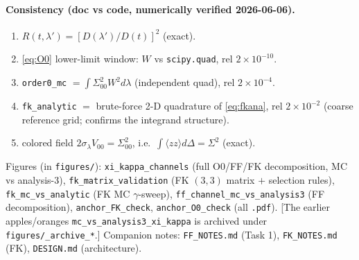 \documentclass[11pt]{article}
\newcommand{\code}[1]{\texttt{#1}}
\newcommand{\lam}{\lambda}
\newcommand{\Sig}{\Sigma^{2}}
\newcommand{\D}{D}
\begin{document}
\paragraph{Consistency (doc vs code, numerically verified 2026-06-06).}
\begin{enumerate}[leftmargin=1.4em,itemsep=1pt]
\item $R(t,\lam')=[\D(\lam')/\D(t)]^2$ \quad(exact).
\item \eqref{eq:O0} lower-limit window: $W$ vs \code{scipy.quad}, rel $2\!\times\!10^{-10}$.
\item \code{order0\_mc} $=\int\Sig_{00}W^2 d\lam$ (independent quad), rel $2\!\times\!10^{-4}$.
\item \code{fk\_analytic} $=$ brute-force 2-D quadrature of \eqref{eq:fkana}, rel $2\!\times\!10^{-2}$
(coarse reference grid; confirms the integrand structure).
\item colored field $2\sigma_\lam V_{00}=\Sig_{00}$, i.e.\ $\int\langle zz\rangle d\Delta=\Sig$ \quad(exact).
\end{enumerate}
Figures (in \code{figures/}): \code{xi\_kappa\_channels} (full O0/FF/FK
decomposition, MC vs analysis-3), \code{fk\_matrix\_validation} (FK $(3,3)$ matrix
$+$ selection rules), \code{fk\_mc\_vs\_analytic} (FK MC $\gamma$-sweep),
\code{ff\_channel\_mc\_vs\_analysis3} (FF decomposition), \code{anchor\_FK\_check},
\code{anchor\_O0\_check} (all \code{.pdf}). [The earlier apples/oranges
\code{mc\_vs\_analysis3\_xi\_kappa} is archived under \code{figures/\_archive\_*}.]
Companion notes: \code{FF\_NOTES.md} (Task 1), \code{FK\_NOTES.md} (FK),
\code{DESIGN.md} (architecture).
\end{document}
